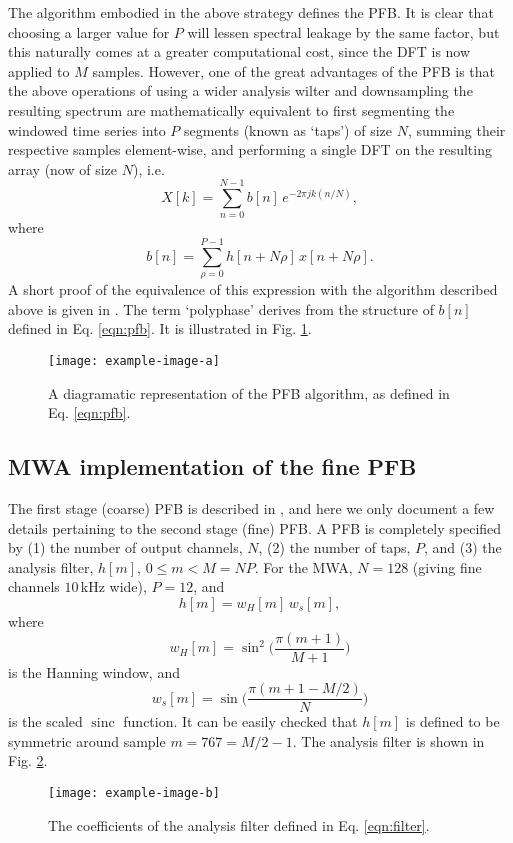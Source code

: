\documentclass{pasa}%
\DeclareMathOperator{\sinc}{sinc}
\begin{document}
The algorithm embodied in the above strategy defines the PFB.
It is clear that choosing a larger value for $P$ will lessen spectral leakage by the same factor, but this naturally comes at a greater computational cost, since the DFT is now applied to $M$ samples.
However, one of the great advantages of the PFB is that the above operations of using a wider analysis wilter and downsampling the resulting spectrum are mathematically equivalent to first segmenting the windowed time series into $P$ segments (known as `taps') of size $N$, summing their respective samples element-wise, and performing a single DFT on the resulting array (now of size $N$), i.e.
\begin{equation}
    X[k] = \sum_{n=0}^{N-1} b[n]\,e^{-2\pi j k (n/N)},
    \label{eqn:pfb}
\end{equation}
where
\begin{equation*}
    b[n] = \sum_{\rho=0}^{P-1} h[n + N\rho]\,x[n + N\rho].
\end{equation*}
A short proof of the equivalence of this expression with the algorithm described above is given in \citet{Harris2011}.
The term `polyphase' derives from the structure of $b[n]$ defined in Eq. \eqref{eqn:pfb}.
It is illustrated in Fig. \ref{fig:pfb}.
\begin{figure}
    \centering
    \texttt{[image: example-image-a]}
    \caption{A diagramatic representation of the PFB algorithm, as defined in Eq. \eqref{eqn:pfb}.}
    \label{fig:pfb}
\end{figure}

\subsection{MWA implementation of the fine PFB}

The first stage (coarse) PFB is described in \citet{Prabu2015}, and here we only document a few details pertaining to the second stage (fine) PFB.
A PFB is completely specified by (1) the number of output channels, $N$, (2) the number of taps, $P$, and (3) the analysis filter, $h[m]$, $0 \le m < M=NP$.
For the MWA, $N=128$ (giving fine channels $10\,$kHz wide), $P=12$, and
\begin{equation}
    h[m] = w_H[m]\,w_s[m],
    \label{eqn:filter}
\end{equation}
where
\begin{equation*}
    w_H[m] = \sin^2\bigg(\frac{\pi (m+1)}{M+1}\bigg)
\end{equation*}
is the Hanning window, and
\begin{equation*}
    w_s[m] = \sin\bigg(\frac{\pi(m + 1 - M/2)}{N}\bigg)
\end{equation*}
is the scaled $\sinc$ function.
It can be easily checked that $h[m]$ is defined to be symmetric around sample $m = 767 = M/2-1$.
The analysis filter is shown in Fig. \ref{fig:filter}.
\begin{figure}
    \centering
    \texttt{[image: example-image-b]}
    \caption{The coefficients of the analysis filter defined in Eq. \eqref{eqn:filter}.}
    \label{fig:filter}
\end{figure}
\end{document}
